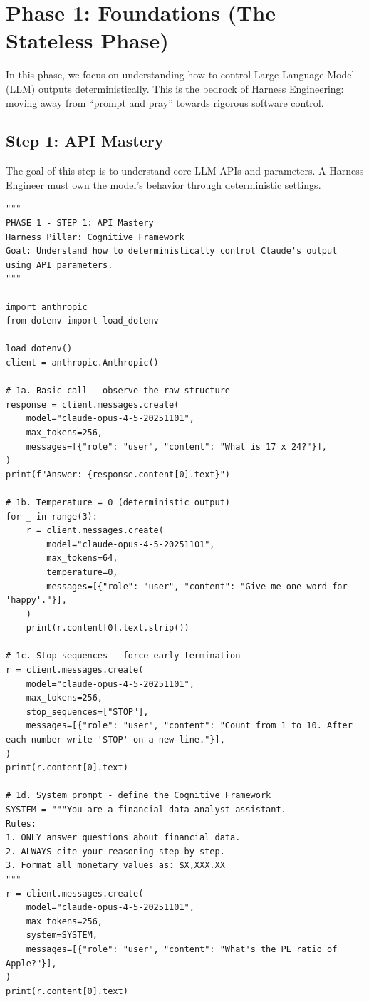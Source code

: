 \chapter{Phase 1: Foundations (The Stateless Phase)}

In this phase, we focus on understanding how to control Large Language Model (LLM) outputs deterministically. This is the bedrock of Harness Engineering: moving away from ``prompt and pray'' towards rigorous software control.

\section{Step 1: API Mastery}
The goal of this step is to understand core LLM APIs and parameters. A Harness Engineer must own the model's behavior through deterministic settings.

\begin{lstlisting}[caption={step1\_api\_mastery.py}, label={lst:step1}]
"""
PHASE 1 - STEP 1: API Mastery
Harness Pillar: Cognitive Framework
Goal: Understand how to deterministically control Claude's output using API parameters.
"""

import anthropic
from dotenv import load_dotenv

load_dotenv()
client = anthropic.Anthropic()

# 1a. Basic call - observe the raw structure
response = client.messages.create(
    model="claude-opus-4-5-20251101",
    max_tokens=256,
    messages=[{"role": "user", "content": "What is 17 x 24?"}],
)
print(f"Answer: {response.content[0].text}")

# 1b. Temperature = 0 (deterministic output)
for _ in range(3):
    r = client.messages.create(
        model="claude-opus-4-5-20251101",
        max_tokens=64,
        temperature=0,
        messages=[{"role": "user", "content": "Give me one word for 'happy'."}],
    )
    print(r.content[0].text.strip())

# 1c. Stop sequences - force early termination
r = client.messages.create(
    model="claude-opus-4-5-20251101",
    max_tokens=256,
    stop_sequences=["STOP"],
    messages=[{"role": "user", "content": "Count from 1 to 10. After each number write 'STOP' on a new line."}],
)
print(r.content[0].text)

# 1d. System prompt - define the Cognitive Framework
SYSTEM = """You are a financial data analyst assistant.
Rules:
1. ONLY answer questions about financial data.
2. ALWAYS cite your reasoning step-by-step.
3. Format all monetary values as: $X,XXX.XX
"""
r = client.messages.create(
    model="claude-opus-4-5-20251101",
    max_tokens=256,
    system=SYSTEM,
    messages=[{"role": "user", "content": "What's the PE ratio of Apple?"}],
)
print(r.content[0].text)
\end{lstlisting}

